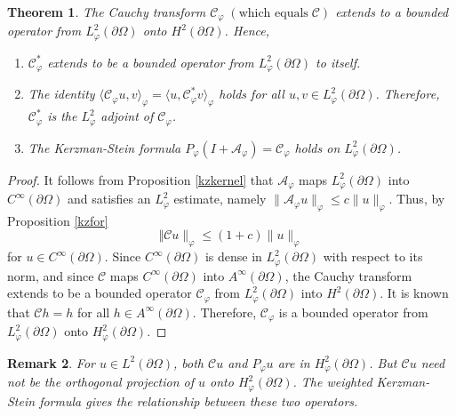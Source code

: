 \documentclass[11pt, reqno]{amsart}
\newtheorem{thm}{Theorem}[section]
\newtheorem{rem}[thm]{Remark}
\numberwithin{equation}{section}
\begin{document}
\begin{thm}
The Cauchy transform $\mathcal{C}_{\varphi} \;(\text {which equals} \;\mathcal C)$ extends to a bounded operator from $L^2_{\varphi}(\partial\Omega)$ onto $H^2(\partial\Omega)$. Hence,
\begin{enumerate}
    \item $\mathcal{C}^{*}_{\varphi}$ extends to be a bounded operator from $L^2_{\varphi}(\partial\Omega)$ to itself.
    \item The identity $\langle \mathcal{C}_{\varphi}u,v\rangle_{\varphi}=\langle u,\mathcal{C}^{*}_{\varphi}v\rangle_{\varphi}$ holds for all $u,v\in L^2_{\varphi}(\partial\Omega)$. Therefore, $\mathcal{C}^{*}_{\varphi}$ is the $L^2_{\varphi}$ adjoint of $\mathcal{C}_{\varphi}$.
    \item The Kerzman-Stein formula $P_{\varphi}(I+\mathcal{A}_{\varphi})=\mathcal{C}_{\varphi}$ holds on $L^2_{\varphi}(\partial\Omega)$.
\end{enumerate}
\end{thm}
\begin{proof}
It follows from Proposition \ref{kzkernel} that $\mathcal{A}_{\varphi}$ maps $L^2_{\varphi}(\partial\Omega)$ into $C^{\infty}(\partial\Omega)$ and satisfies an $L^2_{\varphi}$ estimate, namely $\lVert \mathcal{A}_{\varphi}u\rVert_{\varphi}\leq c\lVert u\rVert_{\varphi}$. Thus, by Proposition \ref{kzfor} 
\[
\Vert \mathcal{C}u\rVert_{\varphi}\leq (1+c)\lVert u\rVert_{\varphi}
\]
for $u\in C^{\infty}(\partial\Omega)$. Since $C^{\infty}(\partial\Omega)$ is dense in $L^2_{\varphi}(\partial\Omega)$ with respect to its norm, and since $\mathcal{C}$ maps $C^{\infty}(\partial\Omega)$ into $A^{\infty}(\partial\Omega)$, the Cauchy transform extends to be a bounded operator $\mathcal{C}_{\varphi}$ from $L^2_{\varphi}(\partial\Omega)$ into $H^2(\partial\Omega)$. It is known that $\mathcal{C}h = h$ for all $h\in A^{\infty}(\partial\Omega)$. Therefore, $\mathcal{C}_{\varphi}$ is a bounded operator from $L^2_{\varphi}(\partial\Omega)$ onto $H^2_{\varphi}(\partial\Omega)$.
\end{proof}

\begin{rem} 
For $u\in L^2(\partial\Omega)$, both $\mathcal{C}u$ and $P_{\varphi}u$ are in $H^2_{\varphi}(\partial\Omega)$. But $\mathcal{C}u$ need not be the orthogonal projection of $u$ onto $H^{2}_{\varphi}(\partial\Omega)$. The weighted Kerzman-Stein formula gives the relationship between these two operators.
\end{rem}
\end{document}
